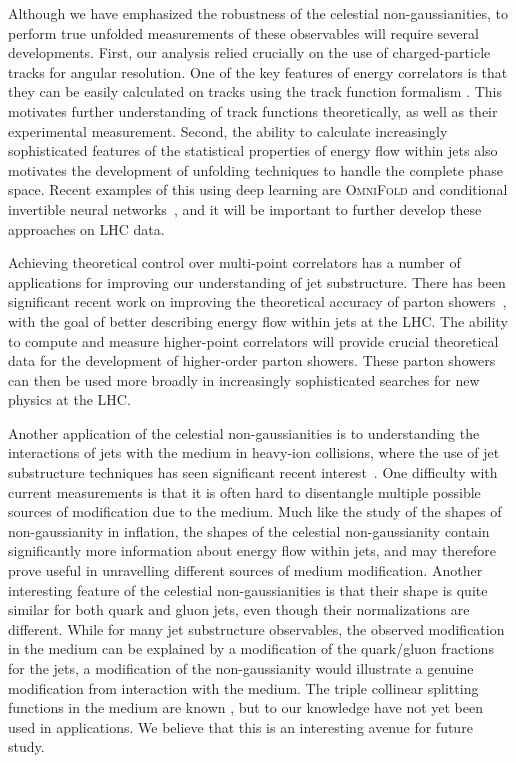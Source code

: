 \documentclass[letterpaper,11pt]{article}
\begin{document}
Although we have emphasized the robustness of the celestial non-gaussianities, to perform true unfolded measurements of these observables will require several developments.
%
First, our analysis relied crucially on the use of charged-particle tracks for angular resolution.
%
One of the key features of energy correlators is that they can be easily calculated on tracks \cite{Chen:2020vvp,Li:2021zcf,Jaarsma:2022kdd} using the track function formalism \cite{Chang:2013rca,Chang:2013iba}.
%
This motivates further understanding of track functions theoretically, as well as their experimental measurement.
%
Second, the ability to calculate increasingly sophisticated features of the statistical properties of energy flow within jets also motivates the development of unfolding techniques to handle the complete phase space.
%
Recent examples of this using deep learning are \textsc{OmniFold} \cite{Andreassen:2019cjw} and conditional invertible neural networks~\cite{Bellagente:2020piv}, and it will be important to further develop these approaches on LHC data.


Achieving theoretical control over multi-point correlators has a number of applications for improving our understanding of jet substructure.
%
There has been significant recent work on improving the theoretical accuracy of parton showers~\cite{Li:2016yez,Hoche:2017hno,Hoche:2017iem,Dulat:2018vuy,Gellersen:2021eci,Hamilton:2020rcu,Dasgupta:2020fwr,Hamilton:2021dyz,Karlberg:2021kwr}, with the goal of better describing energy flow within jets at the LHC.
%
The ability to compute and measure higher-point correlators will provide crucial theoretical data for the development of higher-order parton showers.
%
These parton showers can then be used more broadly in increasingly sophisticated searches for new physics at the LHC. 


Another application of the celestial non-gaussianities is to understanding the interactions of jets with the medium in heavy-ion collisions, where the use of jet substructure techniques has seen significant recent interest~\cite{Andrews:2018jcm,Cunqueiro:2021wls}.
%
One difficulty with current measurements is that it is often hard to disentangle multiple possible sources of modification due to the medium.
%
Much like the study of the shapes of non-gaussianity in inflation, the shapes of the celestial non-gaussianity contain significantly more information about energy flow within jets, and may therefore prove useful in unravelling different sources of medium modification.
%
Another interesting feature of the celestial non-gaussianities is that their shape is quite similar for both quark and gluon jets, even though their normalizations are different. 
%
While for many jet substructure observables, the observed modification in the medium can be explained by a modification of the quark/gluon fractions for the jets, a modification of the non-gaussianity would illustrate a genuine modification from interaction with the medium.
%
The triple collinear splitting functions in the medium are known \cite{Fickinger:2013xwa}, but to our knowledge have not yet been used in applications.
%
We believe that this is an interesting avenue for future study.
\end{document}
